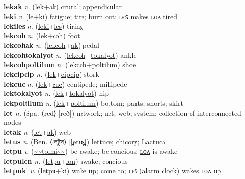 \textbf{lekak} \textit{n.} (\hyperref[lek]{lek}+\hyperref[ak]{ak})
crural; appendicular \label{lekak} \\
\textbf{leki} \textit{v.} (\hyperref[le]{le}+\hyperref[ki]{ki})
fatigue; tire; burn out; \hyperref[lekiles]{ʟєꜱ} makes ʟᴏᴧ tired \label{leki} \\
\textbf{lekiles} \textit{n.} (\hyperref[leki]{leki}+\hyperref[les]{les})
tiring \label{lekiles} \\
\textbf{lekcoh} \textit{n.} (\hyperref[lek]{lek}+\hyperref[coh]{coh})
foot \label{lekcoh} \\
\textbf{lekcohak} \textit{n.} (\hyperref[lekcoh]{lekcoh}+\hyperref[ak]{ak})
pedal \label{lekcohak} \\
\textbf{lekcohtokalyot} \textit{n.} (\hyperref[lekcoh]{lekcoh}+\hyperref[tokalyot]{tokalyot})
ankle \label{lekcohtokalyot} \\
\textbf{lekcohpoltilum} \textit{n.} (\hyperref[lekcoh]{lekcoh}+\hyperref[poltilum]{poltilum})
shoe \label{lekcohpoltilum} \\
\textbf{lekcipcip} \textit{n.} (\hyperref[lek]{lek}+\hyperref[cipcip]{cipcip})
stork \label{lekcipcip} \\
\textbf{lekcuc} \textit{n.} (\hyperref[lek]{lek}+\hyperref[cuc]{cuc})
centipede; millipede \label{lekcuc} \\
\textbf{lektokalyot} \textit{n.} (\hyperref[lek]{lek}+\hyperref[tokalyot]{tokalyot})
hip \label{lektokalyot} \\
\textbf{lekpoltilum} \textit{n.} (\hyperref[lek]{lek}+\hyperref[poltilum]{poltilum})
bottom; pants; shorts; skirt \label{lekpoltilum} \\
\textbf{let} \textit{n.} (Spa. ⟨red⟩ [reð])
network; net; web; system; collection of interconnected nodes \label{let} \\
\textbf{letak} \textit{n.} (\hyperref[let]{let}+\hyperref[ak]{ak})
web \label{letak} \\
\textbf{letus} \textit{n.} (Ben. ⟨লেটুস⟩ [l̪etus̪])
lettuce; chicory; Lactuca \label{letus} \\
\textbf{letpu} \textit{v.} (\hyperref[tolmi]{\~{}\~{}tolmi\~{}\~{}})
be awake; be concious; \hyperref[letpulon]{ʟᴏᴧ} is awake \label{letpu} \\
\textbf{letpulon} \textit{n.} (\hyperref[letpu]{letpu}+\hyperref[lon]{lon})
awake; concious \label{letpulon} \\
\textbf{letpuki} \textit{v.} (\hyperref[letpu]{letpu}+\hyperref[ki]{ki})
wake up; come to; ʟєꜱ (alarm clock) wakes ʟᴏᴧ up \label{letpuki} \\
